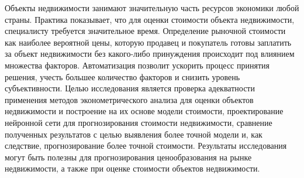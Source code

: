 \label{sec:introduction}

Объекты недвижимости занимают значительную часть ресурсов экономики любой страны. Практика показывает, что для оценки
стоимости объекта недвижимости, специалисту требуется значительное время. Определение рыночной стоимости как наиболее вероятной цены,
которую продавец и покупатель готовы заплатить за объект недвижимости без какого-либо принуждения происходит под
влиянием множества факторов. Автоматизация позволит ускорить процесс принятия решения, учесть
большее количество факторов и снизить уровень субъективности.
Целью исследования является проверка адекватности применения методов эконометрического
анализа для оценки объектов недвижимости и построение на их основе модели стоимости, проектирование нейронной сети для
прогнозирования стоимости недвижимости, сравнение полученных результатов с целью выявления более точной модели и, как
следствие, прогнозирование более точной стоимости. Результаты исследования могут быть полезны для прогнозирования
ценообразования на рынке недвижимости, а также при оценке стоимости объектов недвижимости.
